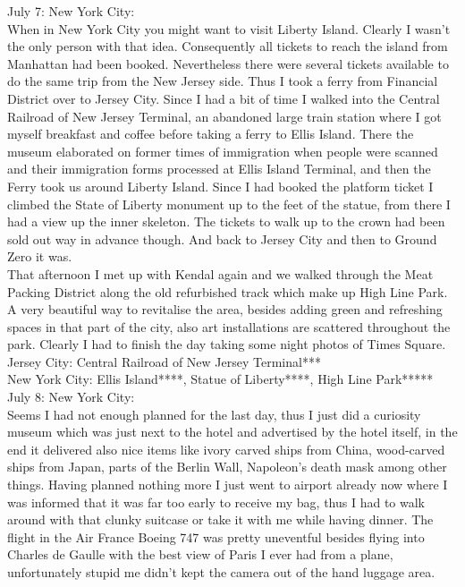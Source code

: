 July 7: New York City:\\
When in New York City you might want to visit Liberty Island. Clearly I wasn't the only person with that idea. Consequently all tickets to reach the island from Manhattan had been booked. Nevertheless there were several tickets available to do the same trip from the New Jersey side. Thus I took a ferry from Financial District over to Jersey City. Since I had a bit of time I walked into the Central Railroad of New Jersey Terminal, an abandoned large train station where I got myself breakfast and coffee before taking a ferry to Ellis Island. There the museum elaborated on former times of immigration when people were scanned and their immigration forms processed at Ellis Island Terminal, and then the Ferry took us around Liberty Island. Since I had booked the platform ticket I climbed the State of Liberty monument up to the feet of the statue, from there I had a view up the inner skeleton. The tickets to walk up to the crown had been sold out way in advance though. And back to Jersey City and then to Ground Zero it was. \\
That afternoon I met up with Kendal again and we walked through the Meat Packing District along the old refurbished track which make up High Line Park. A very beautiful way to revitalise the area, besides adding green and refreshing spaces in that part of the city, also art installations are scattered throughout the park. Clearly I had to finish the day taking some night photos of Times Square.\\

Jersey City: Central Railroad of New Jersey Terminal***\\
New York City: Ellis Island****, Statue of Liberty****, High Line Park*****\\

July 8: New York City:\\
Seems I had not enough planned for the last day, thus I just did a curiosity museum which was just next to the hotel and advertised by the hotel itself, in the end it delivered also nice items like ivory carved ships from China, wood-carved ships from Japan, parts of the Berlin Wall, Napoleon's death mask among other things. Having planned nothing more I just went to airport already now where I was informed that it was far too early to receive my bag, thus I had to walk around with that clunky suitcase or take it with me while having dinner. The flight in the Air France Boeing 747 was pretty uneventful besides flying into Charles de Gaulle with the best view of Paris I ever had from a plane, unfortunately stupid me didn't kept the camera out of the hand luggage area.\\

